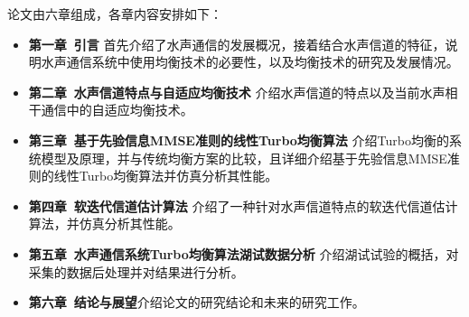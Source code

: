 论文由六章组成，各章内容安排如下：
\begin{itemize}
  \item \textbf{第一章~引言}\quad
    首先介绍了水声通信的发展概况，接着结合水声信道的特征，说明水声通信系统中使用均衡技术的必要性，以及均衡技术的研究及发展情况。
  \item \textbf{第二章~水声信道特点与自适应均衡技术}\quad
    介绍水声信道的特点以及当前水声相干通信中的自适应均衡技术。
  \item \textbf{第三章~基于先验信息MMSE准则的线性Turbo均衡算法}\quad
      介绍Turbo均衡的系统模型及原理，并与传统均衡方案的比较，且详细介绍基于先验信息MMSE准则的线性Turbo均衡算法并仿真分析其性能。
  \item \textbf{第四章~软迭代信道估计算法}\quad
    介绍了一种针对水声信道特点的软迭代信道估计算法，并仿真分析其性能。
  \item \textbf{第五章~水声通信系统Turbo均衡算法湖试数据分析}\quad 
      介绍湖试试验的概括，对采集的数据后处理并对结果进行分析。
  \item \textbf{第六章~结论与展望}\quad 介绍论文的研究结论和未来的研究工作。
\end{itemize}
\clearpage{\pagestyle{empty}\cleardoublepage}
